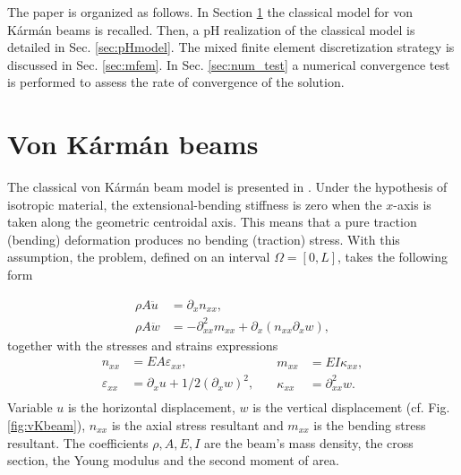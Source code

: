 \documentclass{ifacconf}
\begin{document}
The paper is organized as follows. In Section \ref{sec:vK_beams} the classical model for von K\'arm\'an beams is recalled. Then, a pH realization of the classical model is detailed in Sec. \ref{sec:pHmodel}. The mixed finite element discretization strategy is discussed in Sec. \ref{sec:mfem}. In Sec. \ref{sec:num_test} a numerical convergence test is performed to assess the rate of convergence of the solution.



\section{Von K\'arm\'an beams}\label{sec:vK_beams}


The classical von K\'arm\'an beam model is presented in \cite[Chapter 4]{reddy2010introduction}. Under the hypothesis of isotropic material, the extensional-bending stiffness is zero when the $x$-axis is taken along the geometric centroidal axis. This means that a pure traction (bending) deformation produces no bending (traction) stress. With this assumption, the problem, defined on an interval $\Omega = [0, L]$, takes the following form

\begin{equation}\label{eq:class}
	\begin{aligned}
		\rho A \ddot{u} &= \partial_x n_{xx}, \\
		\rho A \ddot{w} &= -\partial^2_{xx} m_{xx} + \partial_x(n_{xx} \partial_x w),
	\end{aligned} 
\end{equation}
together with the stresses and strains expressions
\begin{equation}
	\begin{aligned}
		n_{xx} &= EA \varepsilon_{xx}, \\
		\varepsilon_{xx} &= \partial_x u + 1/2 (\partial_x w)^2, \\
	\end{aligned} \quad
	\begin{aligned}
		m_{xx} &= EI \kappa_{xx}, \\
		\kappa_{xx} &=\partial^2_{xx} w. \\
	\end{aligned} 
\end{equation}
Variable $u$ is the horizontal displacement, $w$ is the vertical displacement (cf. Fig. \ref{fig:vKbeam}), $n_{xx}$ is the axial stress resultant and $m_{xx}$ is the bending stress resultant. The coefficients $\rho, A, E, I$ are the beam's mass density, the cross section, the Young modulus and the second moment of area.
\end{document}
